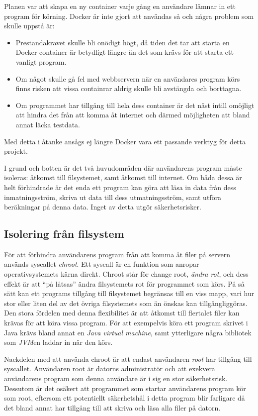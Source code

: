 \documentclass{article}
\begin{document}
Planen var att skapa en ny container varje gång en användare lämnar in ett
program för körning. Docker är inte gjort att användas så och några problem som
skulle uppstå är:
\begin{itemize}
	\item Prestandakravet skulle bli onödigt högt, då tiden det tar att starta
		en Docker-container är betydligt längre än det som krävs för att starta
		ett vanligt program.
	\item Om något skulle gå fel med webbservern när en användares program körs
		finns risken att vissa containrar aldrig skulle bli avstängda och
		borttagna.
	\item Om programmet har tillgång till hela dess container är det näst
		intill omöjligt att hindra det från att komma åt internet och därmed
		möjligheten att bland annat läcka testdata.
\end{itemize}
Med detta i åtanke ansågs ej längre Docker vara ett passande verktyg för detta
projekt.

I grund och botten är det två huvudområden där användarens program måste
isoleras: åtkomst till filsystemet, samt åtkomst till internet. Om båda dessa är
helt förhindrade är det enda ett program kan göra att läsa in data från dess
inmatningsström, skriva ut data till dess utmatningsström, samt utföra
beräkningar på denna data. Inget av detta utgör säkerhetsrisker.

\subsection{Isolering från filsystem}

För att förhindra användarens program från att komma åt filer på servern används
syscallet \textit{chroot}. Ett syscall är en funktion som anropar
operativsystemets kärna direkt. Chroot står för change root,
\textit{ändra rot}, och dess effekt är att ``på låtsas'' ändra filsystemets rot
för programmet som körs. På så sätt kan ett programs tillgång till filsystemet
begränsas till en viss mapp, vari hur stor eller liten del av det övriga
filsystemets som än önskas kan tillgängliggöras. Den stora fördelen med denna
flexibilitet är att åtkomst till flertalet filer kan krävas för att köra vissa
program. För att exempelvis köra ett program skrivet i Java krävs bland annat en
\textit{Java virtual machine}, samt ytterligare några bibliotek som
\textit{JVM}en laddar in när den körs.

Nackdelen med att använda chroot är att endast användaren \textit{root} har
tillgång till syscallet. Användaren root är datorns administratör och att
exekvera an\-vändarens program som denna användare är i sig en stor säkerhetsrisk.
Dessutom är det osäkert att programmet som startar användarens program kör som
root, eftersom ett potentiellt säkerhetshål i detta program blir farligare då
det bland annat har tillgång till att skriva och läsa alla filer på datorn.
\end{document}
